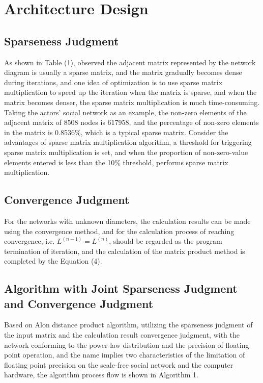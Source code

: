 \documentclass[review]{cvpr}
\begin{document}
\section{Architecture Design}

\subsection{Sparseness Judgment}

As shown in Table (1), observed the adjacent matrix represented by the network diagram is usually a sparse matrix, and the matrix gradually becomes dense during iterations,
and one idea of optimization is to use sparse matrix multiplication to speed up the iteration when the matrix is sparse, and when the matrix becomes denser, the sparse matrix multiplication is much time-consuming.
Taking the actors' social network as an example, the non-zero elements of the adjacent matrix of 8508 nodes is 617958, and the percentage of non-zero elements in the matrix is 0.8536\%, which is a typical sparse matrix.
Consider the advantages of sparse matrix multiplication algorithm, a threshold for triggering sparse matrix multiplication is set,
and when the proportion of non-zero-value elements entered is less than the 10\% threshold, performs sparse matrix multiplication.

\subsection{Convergence Judgment}

For the networks with unknown diameters, the calculation results can be made using the convergence method, and for the calculation process of reaching convergence,
i.e. $L^{(n-1)}=L^{(n)}$, should be regarded as the program termination of iteration, and the calculation of the matrix product method is completed by the Equation (4).

\subsection{Algorithm with Joint Sparseness Judgment and Convergence Judgment}

Based on Alon \etal distance product algorithm, utilizing the sparseness judgment of the input matrix and the calculation result convergence judgment,
with the network conforming to the power-law distribution and the precision of floating point operation, and the name implies two characteristics of the limitation
of floating point precision on the scale-free social network and the computer hardware, the algorithm process flow is shown in Algorithm 1.
\end{document}
